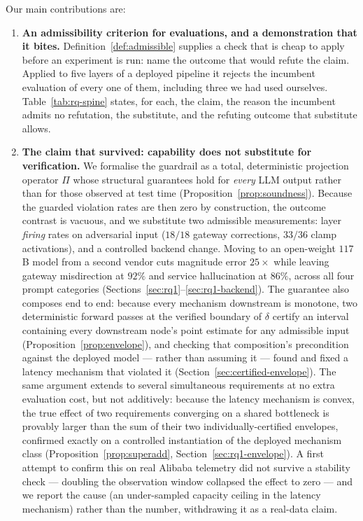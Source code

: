 \documentclass[journal, 10pt]{IEEEtran}
\begin{document}
Our main contributions are:
\begin{enumerate}
    \item \textbf{An admissibility criterion for evaluations, and a demonstration that it bites.} Definition~\ref{def:admissible} supplies a check that is cheap to apply before an experiment is run: name the outcome that would refute the claim. Applied to five layers of a deployed pipeline it rejects the incumbent evaluation of every one of them, including three we had used ourselves. Table~\ref{tab:rq-spine} states, for each, the claim, the reason the incumbent admits no refutation, the substitute, and the refuting outcome that substitute allows.
    \item \textbf{The claim that survived: capability does not substitute for verification.} We formalise the guardrail as a total, deterministic projection operator $\Pi$ whose structural guarantees hold for \emph{every} LLM output rather than for those observed at test time (Proposition~\ref{prop:soundness}). Because the guarded violation rates are then zero by construction, the outcome contrast is vacuous, and we substitute two admissible measurements: layer \emph{firing} rates on adversarial input ($18/18$ gateway corrections, $33/36$ clamp activations), and a controlled backend change. Moving to an open-weight $117$B model from a second vendor cuts magnitude error $25{\times}$ while leaving gateway misdirection at $92\%$ and service hallucination at $86\%$, across all four prompt categories (Sections~\ref{sec:rq1}--\ref{sec:rq1-backend}). The guarantee also composes end to end: because every mechanism downstream is monotone, two deterministic forward passes at the verified boundary of $\delta$ certify an interval containing every downstream node's point estimate for any admissible input (Proposition~\ref{prop:envelope}), and checking that composition's precondition against the deployed model --- rather than assuming it --- found and fixed a latency mechanism that violated it (Section~\ref{sec:certified-envelope}). The same argument extends to several simultaneous requirements at no extra evaluation cost, but not additively: because the latency mechanism is convex, the true effect of two requirements converging on a shared bottleneck is provably larger than the sum of their two individually-certified envelopes, confirmed exactly on a controlled instantiation of the deployed mechanism class (Proposition~\ref{prop:superadd}, Section~\ref{sec:rq1-envelope}). A first attempt to confirm this on real Alibaba telemetry did not survive a stability check --- doubling the observation window collapsed the effect to zero --- and we report the cause (an under-sampled capacity ceiling in the latency mechanism) rather than the number, withdrawing it as a real-data claim.

\end{enumerate}
\end{document}
